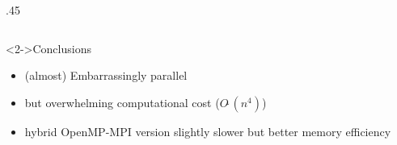 \documentclass{beamer}
\newcommand{\SO}[1]{\ensuremath{O\tilde\ (#1)}\xspace}
\begin{document}
\begin{frame}
\begin{columns}
\begin{column} {.45\textwidth}
\begin{center}
        \end{center}
      \end{column}
      \end{columns}
      \begin{block}<2->{Conclusions}
        \begin{itemize}
        \item (almost) Embarrassingly parallel
        \item but overwhelming computational cost ($\SO{n^4}$)
        \item hybrid OpenMP-MPI version slightly slower but better memory efficiency
        \end{itemize}
      \end{block}
\end{frame}

\end{document}
